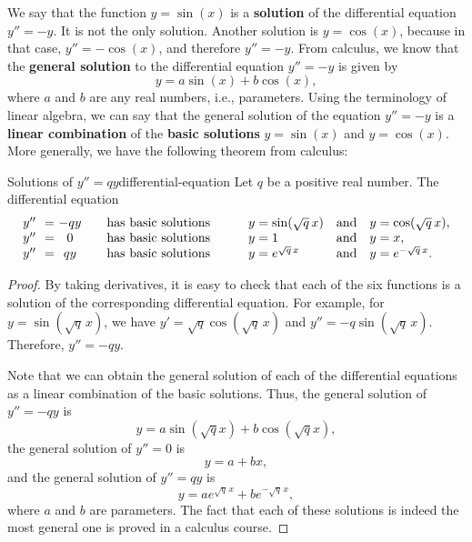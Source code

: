 We say that the function $y=\sin(x)$ is a \textbf{solution}%
 of the differential equation
$y'' = -y$. It is not the only solution. Another solution is
$y=\cos(x)$, because in that case, $y''=-\cos(x)$, and therefore
$y''=-y$. From calculus, we know that the \textbf{general solution} to
the differential equation $y'' = -y$ is given by
\begin{equation*}
  y = a\sin(x) + b\cos(x),
\end{equation*}
where $a$ and $b$ are any real numbers, i.e., parameters. Using the
terminology of linear algebra, we can say that the general solution of
the equation $y'' = -y$ is a \textbf{linear combination}%
of the \textbf{basic solutions}%
%
 $y=\sin(x)$ and
$y=\cos(x)$. More generally, we have the following theorem from
calculus:

\begin{theorem}{Solutions of $y''=qy$}{differential-equation}
  Let $q$ be a positive real number.  The differential equation
  \begin{equation*}
    \begin{array}{l@{~~}l@{~}clllll}
    y'' &=& -qy &\quad\mbox{has basic solutions}\quad\quad &
    y = \sin(\sqrt{q}\,x) & \mbox{and} & y = \cos(\sqrt{q}\,x),\\
    y'' &=& 0 &\quad\mbox{has basic solutions}\quad\quad &
    y = 1 & \mbox{and} & y = x, \\
    y'' &=& qy &\quad\mbox{has basic solutions}\quad\quad &
    y = e^{\sqrt{q}\,x} & \mbox{and} & y = e^{-\sqrt{q}\,x}. \\
    \end{array}
  \end{equation*}
\end{theorem}

\begin{proof}
  By taking derivatives, it is easy to check that each of the six
  functions is a solution of the corresponding differential
  equation. For example, for $y=\sin(\sqrt{q}\,x)$, we have
  $y'=\sqrt{q}\cos(\sqrt{q}\,x)$ and
  $y''=-q\sin(\sqrt{q}\,x)$. Therefore, $y''=-qy$.

  Note that we can obtain the general solution of each of the
  differential equations as a linear combination of the basic
  solutions. Thus, the general solution of $y''=-qy$ is
  \begin{equation*}
      y = a\sin(\sqrt{q}x) + b\cos(\sqrt{q}x),
  \end{equation*}
  the general solution of $y''=0$ is
  \begin{equation*}
      y = a + bx,
  \end{equation*}
  and the general solution of $y''=qy$ is
  \begin{equation*}
      y = ae^{\sqrt{q}\,x} + be^{-\sqrt{q}\,x},
  \end{equation*}
  where $a$ and $b$ are parameters. The fact that each of these
  solutions is indeed the most general one is proved in a calculus
  course.
\end{proof}

